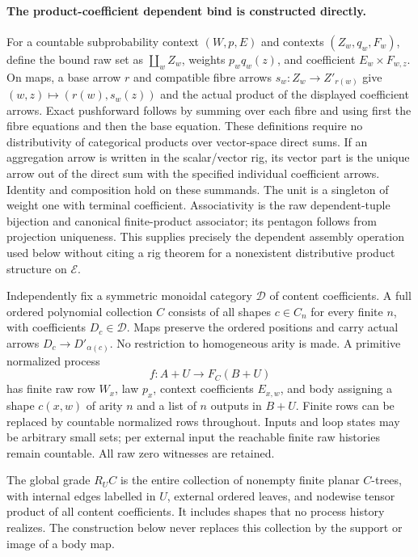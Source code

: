 \documentclass[11pt]{article}
\newcommand{\E}{\mathcal E}
\begin{document}
\paragraph{The product-coefficient dependent bind is constructed directly.}
For a countable subprobability context $(W,p,E)$ and contexts $(Z_w,q_w,F_w)$, define the bound raw set as $\coprod_w Z_w$, weights $p_wq_w(z)$, and coefficient $E_w\times F_{w,z}$. On maps, a base arrow $r$ and compatible fibre arrows $s_w:Z_w\to Z'_{r(w)}$ give $(w,z)\mapsto(r(w),s_w(z))$ and the actual product of the displayed coefficient arrows. Exact pushforward follows by summing over each fibre and using first the fibre equations and then the base equation. These definitions require no distributivity of categorical products over vector-space direct sums. If an aggregation arrow is written in the scalar/vector rig, its vector part is the unique arrow out of the direct sum with the specified individual coefficient arrows. Identity and composition hold on these summands. The unit is a singleton of weight one with terminal coefficient. Associativity is the raw dependent-tuple bijection and canonical finite-product associator; its pentagon follows from projection uniqueness. This supplies precisely the dependent assembly operation used below without citing a rig theorem for a nonexistent distributive product structure on $\E$.

Independently fix a symmetric monoidal category $\mathcal D$ of content coefficients. A full ordered polynomial collection $C$ consists of all shapes $c\in C_n$ for every finite $n$, with coefficients $D_c\in\mathcal D$. Maps preserve the ordered positions and carry actual arrows $D_c\to D'_{\alpha(c)}$. No restriction to homogeneous arity is made. A primitive normalized process
\[
 f:A+U\longrightarrow F_C(B+U)
\]
has finite raw row $W_x$, law $p_x$, context coefficients $E_{x,w}$, and body assigning a shape $c(x,w)$ of arity $n$ and a list of $n$ outputs in $B+U$. Finite rows can be replaced by countable normalized rows throughout. Inputs and loop states may be arbitrary small sets; per external input the reachable finite raw histories remain countable. All raw zero witnesses are retained.

The global grade $R_U C$ is the entire collection of nonempty finite planar $C$-trees, with internal edges labelled in $U$, external ordered leaves, and nodewise tensor product of all content coefficients. It includes shapes that no process history realizes. The construction below never replaces this collection by the support or image of a body map.
\end{document}
